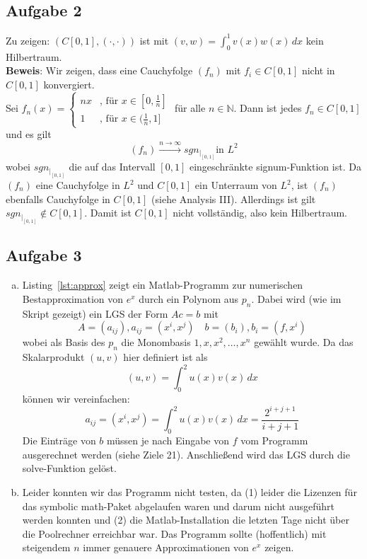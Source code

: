 \documentclass[11pt,a4paper,ngerman]{article}
\begin{document}
\subsection*{Aufgabe 2}
Zu zeigen: $(C[0,1],(\cdot,\cdot))$ ist mit $(v,w) = \int_0^1 v(x)w(x)\,dx$ kein Hilbertraum. \\
\textbf{Beweis}: Wir zeigen, dass eine Cauchyfolge $\left( f_n \right)$ mit $f_i \in C[0,1]$
                 nicht in $C[0,1]$ konvergiert. \\

  Sei $f_n (x) = \begin{cases}
                nx & \text{, für $x \in [0,\frac{1}{n}]$} \\
                1 & \text{, für $x \in (\frac{1}{n},1]$}
             \end{cases}$ für alle $n \in \mathbb{N}$. Dann ist jedes $f_n \in C[0,1]$ und es gilt
  \begin{equation*}
    \left( f_n \right) \stackrel{n \to \infty}{\longrightarrow} sgn_{{\left. \right|}_{[0,1]}} \text{in $L^2$}
  \end{equation*}
  wobei $sgn_{{\left. \right|}_{[0,1]}}$ die auf das Intervall $[0,1]$ eingeschränkte signum-Funktion ist.
  Da $\left(f_n\right)$ eine Cauchyfolge in $L^2$ und $C[0,1]$ ein Unterraum von $L^2$,
  ist $\left(f_n\right)$ ebenfalls Cauchyfolge in $C[0,1]$ (siehe Analysis III).
  Allerdings ist gilt $ sgn_{{\left. \right|}_{[0,1]}} \notin C[0,1]$.
  Damit ist $C[0,1]$ nicht vollständig, also kein Hilbertraum.
  
\subsection*{Aufgabe 3}
\begin{enumerate}[a)]
\item Listing~\ref{lst:approx} zeigt ein Matlab-Programm zur numerischen Bestapproximation von $e^x$ durch ein Polynom aus $p_n$. Dabei wird (wie im Skript gezeigt) ein LGS der Form $Ac = b$ mit
$$ A = (a_{ij}), a_{ij} = (x^i,x^j) \quad b = (b_i), b_i = (f,x^i) $$
wobei als Basis des $p_n$ die Monombasis ${1,x,x^2,\ldots,x^n}$ gewählt wurde.
Da das Skalarprodukt $(u,v)$ hier definiert ist als 
$$ (u,v) = \int_0^2 u(x)v(x)\,dx $$
können wir vereinfachen:
$$ a_{ij} = (x^i,x^j) = \int_0^2 u(x)v(x)\,dx = \frac{2^{i+j+1}}{i+j+1} $$
Die Einträge von $b$ müssen je nach Eingabe von $f$ vom Programm ausgerechnet werden (siehe Ziele 21).
Anschließend wird das LGS durch die solve-Funktion gelöst.



\item Leider konnten wir das Programm nicht testen, da (1) leider die Lizenzen für das symbolic math-Paket abgelaufen waren und darum nicht ausgeführt werden konnten und (2) die Matlab-Installation die letzten Tage nicht über die Poolrechner erreichbar war.
Das Programm sollte (hoffentlich) mit steigendem $n$ immer genauere Approximationen von $e^x$ zeigen.\\
\end{enumerate}
\label{LastPage}
\end{document}
